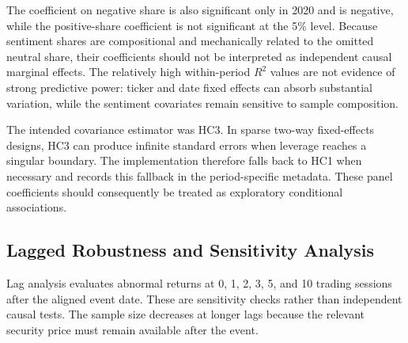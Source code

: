 \documentclass[12pt,a4paper]{article}
\begin{document}
The coefficient on negative share is also significant only in 2020 and is negative, while the positive-share coefficient is not significant at the 5\% level. Because sentiment shares are compositional and mechanically related to the omitted neutral share, their coefficients should not be interpreted as independent causal marginal effects. The relatively high within-period $R^2$ values are not evidence of strong predictive power: ticker and date fixed effects can absorb substantial variation, while the sentiment covariates remain sensitive to sample composition.

The intended covariance estimator was HC3. In sparse two-way fixed-effects designs, HC3 can produce infinite standard errors when leverage reaches a singular boundary. The implementation therefore falls back to HC1 when necessary and records this fallback in the period-specific metadata. These panel coefficients should consequently be treated as exploratory conditional associations.



\subsection{Lagged Robustness and Sensitivity Analysis}
\label{subsec:lag-robustness-multi-year}

Lag analysis evaluates abnormal returns at 0, 1, 2, 3, 5, and 10 trading sessions after the aligned event date. These are sensitivity checks rather than independent causal tests. The sample size decreases at longer lags because the relevant security price must remain available after the event.
\end{document}
